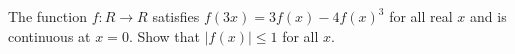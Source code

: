 The function $f : R \to R$ satisfies $f(3x) = 3f(x) - 4f(x)^3$ for all real $x$ and is continuous at $x = 0$. Show that $|f(x)| \le 1$ for all $x$.